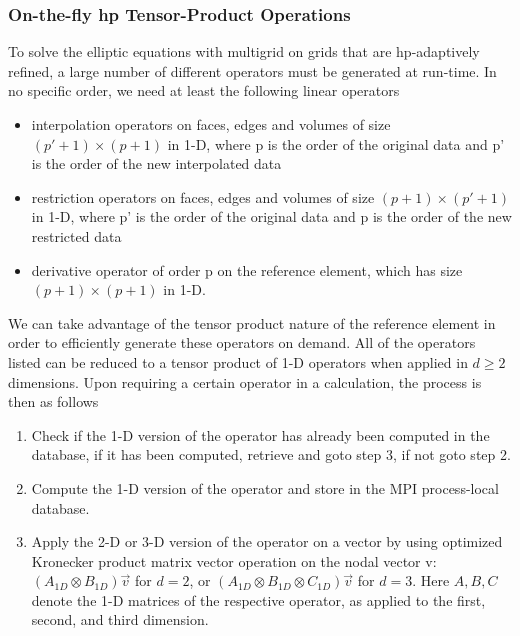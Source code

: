 
\subsubsection{On-the-fly hp Tensor-Product Operations}
\label{sec:tensorproduct}
To solve the elliptic equations with multigrid on grids that are hp-adaptively refined, a large number of different operators must be generated at run-time. In no specific order, we need at least the following linear operators

\begin{itemize}
\item interpolation operators on faces, edges and volumes of size $(p'+1) \times (p+1)$ in 1-D, where p is the order of the original data and p' is the order of the new interpolated data
\item restriction operators on faces, edges and volumes of size $(p+1) \times (p'+1)$ in 1-D, where p' is the order of the original data and p is the order of the new restricted data
\item derivative operator of order p on the reference element, which has size $(p+1) \times (p+1)$ in 1-D.
\end{itemize}

We can take advantage of the tensor product nature of the reference element in order to efficiently generate these operators on demand. All of the operators
listed can be reduced to a tensor product of 1-D operators when applied in $d\ge 2$ dimensions. Upon requiring a certain operator in a calculation, the process is then as follows

\begin{enumerate}
\item Check if the 1-D version of the operator has already been computed in the database, if it has been computed, retrieve and goto step 3, if not goto step 2.
\item Compute the 1-D version of the operator and store in the MPI process-local database.
\item Apply the 2-D or 3-D version of the operator on a vector by using optimized Kronecker product matrix vector operation on the nodal vector v: $(A_{1D} \otimes B_{1D})\vec{v}$ for $d=2$, or $(A_{1D} \otimes B_{1D} \otimes C_{1D})\vec{v}$ for $d=3$. Here $A,B, C$ denote the 1-D matrices of the respective operator, as applied to the first, second, and third dimension.
\end{enumerate}

